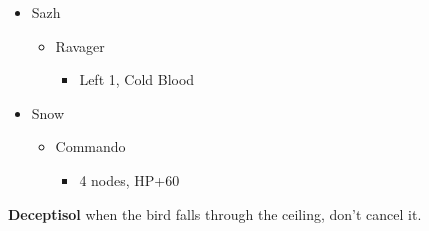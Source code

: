 \begin{multicols}{2}
\begin{menu}
\begin{itemize}
    \crystarium
    \begin{itemize}
        \item Sazh
        \begin{itemize}
            \item Ravager
            \begin{itemize}
                \item Left 1, Cold Blood
            \end{itemize}
        \end{itemize}
        \item Snow
        \begin{itemize}
            \item Commando
            \begin{itemize}
                \item 4 nodes, HP+60
            \end{itemize}
        \end{itemize}
    \end{itemize}
\end{itemize}
\end{menu}
\textbf{Deceptisol} when the bird falls through the ceiling, don't cancel it.
\vfill


\end{multicols}
